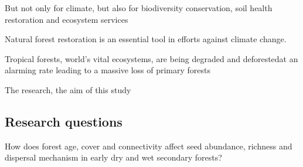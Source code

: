 But not only for climate, but also for biodiversity conservation, soil health restoration and ecosystem services

Natural forest restoration is an essential tool in efforts against climate change.

Tropical forests, world's vital ecosystems, are being degraded and deforestedat an alarming rate leading to a massive loss of primary forests


The research, the aim of this study


\subsection{Research questions}

How does forest age, cover and connectivity affect seed abundance, richness and dispersal mechanism in early dry and wet secondary forests?
